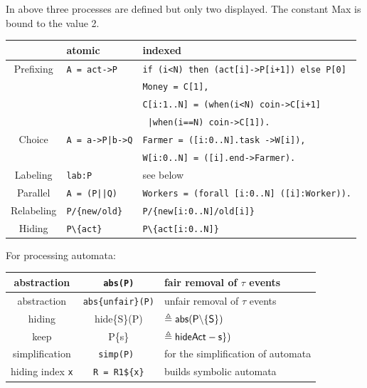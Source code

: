 \documentclass[]{article}
\begin{document}
\noindent In above three processes are defined but only two displayed.  The constant Max is bound to the value 2.


\vspace{2ex}\begin{tabular}{|c|l|l|} \hline
& atomic & indexed \\ \hline
Prefixing & \verb$A = act->P$ &  \verb$if (i<N) then (act[i]->P[i+1]) else P[0]$ \\ \hline
  & &  \verb$Money = C[1], $ \\
  & & \verb$C[i:1..N] = (when(i<N) coin->C[i+1]$ \\
       &   & \hspace{1.7cm} \verb$ |when(i==N) coin->C[1]).$ \\ \hline
Choice  &  \verb$A = a->P|b->Q$  &\verb$Farmer = ([i:0..N].task ->W[i]),$ \\
    &   &\hspace{0.7cm}\verb$W[i:0..N] = ([i].end->Farmer).$ \\ \hline
Labeling & \verb$lab:P$ &  see below \\ \hline
Parallel &  \verb$A = (P||Q)$ & \verb$Workers = (forall [i:0..N] ([i]:Worker)).$ \\ \hline
Relabeling & \verb$P/{new/old}$ &  \verb$P/{new[i:0..N]/old[i]}$ \\ \hline
Hiding & \verb$P\{act}$ & \verb$P\{act[i:0..N]}$ \\ \hline %
\end{tabular}

\vspace{2ex}\noindent For processing automata:

\vspace{2ex}
\begin{tabular}{|c|c|l|}
\hline abstraction  & {\tt abs(P)} & fair removal of $\tau$ events \\
\hline abstraction  & {\tt abs\{unfair\}(P)} & unfair  removal of $\tau$ events \\ \hline
\hline hiding  & {\sf hide\{S\}(P)} & $\sf \triangleq  abs(P\backslash \{S\})$ \\ \hline
\hline keep  & {\sf P\@\{s\}} & $\sf \triangleq  hideAct- s\})$ \\ \hline
simplification  & {\tt simp(P) } & for the simplification of automata \\ \hline
hiding index \verb|x| &\verb|R = R1${x}|&  builds symbolic automata \\ \hline
\end{tabular}
\end{document}
